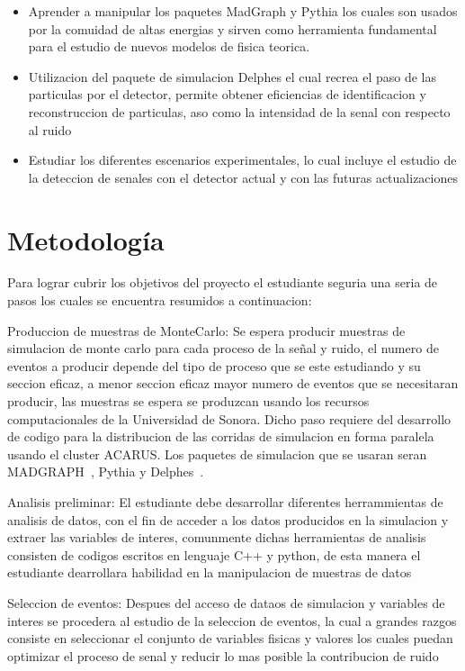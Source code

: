 \begin{itemize}
    \item Aprender a manipular los paquetes MadGraph y Pythia los cuales son usados por la comuidad de altas energias y sirven como herramienta fundamental para el estudio de nuevos modelos de fisica teorica.
    \item Utilizacion del paquete de simulacion Delphes el cual recrea el paso de las particulas por el detector, permite obtener eficiencias de identificacion y reconstruccion de particulas, aso como la intensidad de la senal con respecto al ruido
   \item Estudiar los diferentes escenarios experimentales, lo cual incluye el estudio de la deteccion de senales con el detector actual y con las futuras actualizaciones
\end{itemize}


\chapter{Metodología}

Para lograr cubrir los objetivos del proyecto el estudiante seguria una seria de pasos los cuales se encuentra resumidos a continuacion:

Produccion de muestras de MonteCarlo: Se espera producir muestras de simulacion de monte carlo para cada proceso de la se\~nal y ruido, el numero de eventos a producir depende del tipo de proceso que se este estudiando y su seccion eficaz, a menor seccion eficaz mayor numero de eventos que se necesitaran producir, las muestras se espera se produzcan usando los recursos computacionales de la Universidad de Sonora. Dicho paso requiere del desarrollo de codigo para la distribucion de las corridas de simulacion en forma paralela usando el cluster ACARUS. Los paquetes de simulacion que se usaran seran MADGRAPH~\cite{Alwall:2007st}, Pythia y Delphes~\cite{deFavereau2014}.

Analisis preliminar: El estudiante debe desarrollar diferentes herrammientas de analisis de datos, con el fin de acceder a los datos producidos en la simulacion y extraer las variables de interes, comunmente dichas herramientas de analisis consisten de codigos escritos en lenguaje C++ y python, de esta manera el estudiante dearrollara habilidad en la manipulacion de muestras de datos 

Seleccion de eventos: Despues del acceso de dataos de simulacion y variables de interes se procedera al estudio de la seleccion de eventos, la cual a grandes razgos consiste en seleccionar el conjunto de variables fisicas y valores los cuales puedan optimizar el proceso de senal y reducir lo mas posible la contribucion de ruido 

